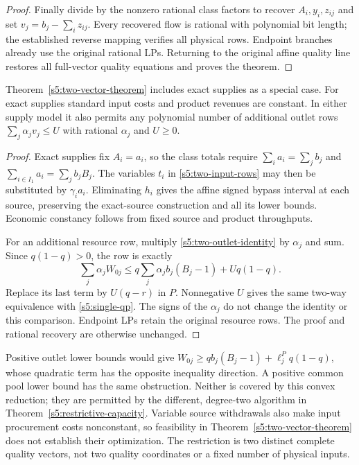 \begin{proof}
Finally divide by the nonzero rational class factors to recover
$A_i,y_i,z_{ij}$ and set $v_j=b_j-\sum_i z_{ij}$. Every recovered flow
is rational with polynomial bit length; the established reverse mapping
verifies all physical rows. Endpoint branches already use the original
rational LPs. Returning to the original affine quality line restores
all full-vector quality equations and proves the theorem.
\end{proof}

\begin{corollary}
\label{s5:two-vector-extensions}
Theorem~\ref{s5:two-vector-theorem} includes exact supplies as a special
case. For exact supplies standard input costs and product revenues are
constant. In either supply model it also permits any polynomial number
of additional outlet rows $\sum_j\alpha_jv_j\le U$ with rational
$\alpha_j$ and $U\ge0$.
\end{corollary}
\begin{proof}
Exact supplies fix $A_i=a_i$, so the class totals require
$\sum_i a_i=\sum_jb_j$ and $\sum_{i\in I_1}a_i=\sum_jb_jB_j$.
The variables $t_i$ in \eqref{s5:two-input-rows} may then be substituted
by $\gamma_i a_i$. Eliminating $h_i$ gives the affine signed bypass
interval at each source, preserving the exact-source construction and
all its lower bounds. Economic constancy follows from fixed source and
product throughputs.

For an additional resource row, multiply
\eqref{s5:two-outlet-identity} by $\alpha_j$ and sum. Since $q(1-q)>0$,
the row is exactly
\[
 \sum_j\alpha_jW_{0j}\le
 q\sum_j\alpha_jb_j(B_j-1)+Uq(1-q).
\]
Replace its last term by $U(q-r)$ in $P$. Nonnegative $U$ gives the
same two-way equivalence with \eqref{s5:single-qp}. The signs of the
$\alpha_j$ do not change the identity or this comparison. Endpoint LPs
retain the original resource rows. The proof and rational recovery are
otherwise unchanged.
\end{proof}

Positive outlet lower bounds would give
$W_{0j}\ge qb_j(B_j-1)+\ell_j^P q(1-q)$, whose quadratic term has the
opposite inequality direction. A positive common pool lower bound has
the same obstruction. Neither is covered by this convex reduction;
they are permitted by the different, degree-two algorithm in
Theorem~\ref{s5:restrictive-capacity}. Variable source withdrawals also
make input procurement costs nonconstant, so feasibility in
Theorem~\ref{s5:two-vector-theorem} does not establish their optimization.
The restriction is two distinct complete quality vectors, not two
quality coordinates or a fixed number of physical inputs.

